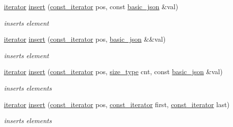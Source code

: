 \begin{DoxyCompactItemize}
\mbox{\hyperlink{classnlohmann_1_1basic__json_a099316232c76c034030a38faa6e34dca}{iterator}} \mbox{\hyperlink{classnlohmann_1_1basic__json_a0136728f5db69d4051c77b94307abd6c}{insert}} (\mbox{\hyperlink{classnlohmann_1_1basic__json_a41a70cf9993951836d129bb1c2b3126a}{const\+\_\+iterator}} pos, const \mbox{\hyperlink{classnlohmann_1_1basic__json}{basic\+\_\+json}} \&val)
\begin{DoxyCompactList}\small\item\em inserts element \end{DoxyCompactList}\item 
\mbox{\hyperlink{classnlohmann_1_1basic__json_a099316232c76c034030a38faa6e34dca}{iterator}} \mbox{\hyperlink{classnlohmann_1_1basic__json_a1ecce113ff11dd294689ee4d45cbb855}{insert}} (\mbox{\hyperlink{classnlohmann_1_1basic__json_a41a70cf9993951836d129bb1c2b3126a}{const\+\_\+iterator}} pos, \mbox{\hyperlink{classnlohmann_1_1basic__json}{basic\+\_\+json}} \&\&val)
\begin{DoxyCompactList}\small\item\em inserts element \end{DoxyCompactList}\item 
\mbox{\hyperlink{classnlohmann_1_1basic__json_a099316232c76c034030a38faa6e34dca}{iterator}} \mbox{\hyperlink{classnlohmann_1_1basic__json_a30a7cc24f2931c20ecae37ec4a5e901f}{insert}} (\mbox{\hyperlink{classnlohmann_1_1basic__json_a41a70cf9993951836d129bb1c2b3126a}{const\+\_\+iterator}} pos, \mbox{\hyperlink{classnlohmann_1_1basic__json_a39f2cd0b58106097e0e67bf185cc519b}{size\+\_\+type}} cnt, const \mbox{\hyperlink{classnlohmann_1_1basic__json}{basic\+\_\+json}} \&val)
\begin{DoxyCompactList}\small\item\em inserts elements \end{DoxyCompactList}\item 
\mbox{\hyperlink{classnlohmann_1_1basic__json_a099316232c76c034030a38faa6e34dca}{iterator}} \mbox{\hyperlink{classnlohmann_1_1basic__json_a404cfe1bdbf1dc6b229627fcf2afb95f}{insert}} (\mbox{\hyperlink{classnlohmann_1_1basic__json_a41a70cf9993951836d129bb1c2b3126a}{const\+\_\+iterator}} pos, \mbox{\hyperlink{classnlohmann_1_1basic__json_a41a70cf9993951836d129bb1c2b3126a}{const\+\_\+iterator}} first, \mbox{\hyperlink{classnlohmann_1_1basic__json_a41a70cf9993951836d129bb1c2b3126a}{const\+\_\+iterator}} last)
\begin{DoxyCompactList}\small\item\em inserts elements \end{DoxyCompactList}\item 

\end{DoxyCompactItemize}
